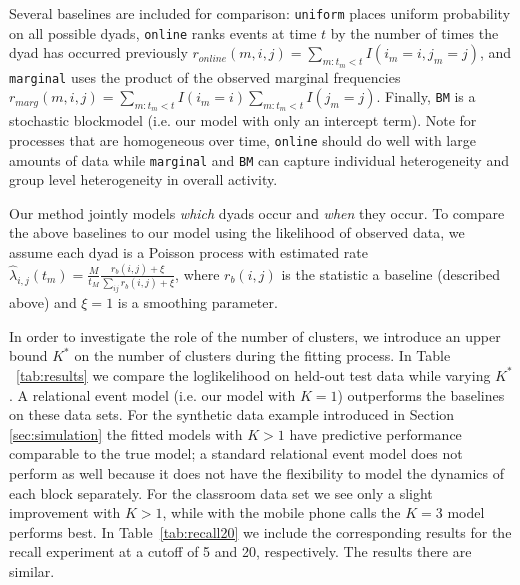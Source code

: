 


Several baselines are included for comparison: \texttt{uniform} places uniform probability on all possible dyads, \texttt{online} ranks events at time $t$ by the number of times the dyad has occurred previously $r_{online}(m,i,j) = \sum_{m:t_m < t} I(i_m=i,j_m=j)$, and \texttt{marginal} uses the product of the observed marginal frequencies $r_{marg}(m,i,j) = \sum_{m:t_m < t} I(i_m=i) \sum_{m:t_m < t} I(j_m=j)$.  
Finally, \texttt{BM} is a stochastic blockmodel (i.e. our model with only an intercept term).
Note for processes that are homogeneous over time, \texttt{online} should do well with large amounts of data while \texttt{marginal} and \texttt{BM} can capture individual heterogeneity and group level heterogeneity in overall activity. 

Our method jointly models \emph{which} dyads occur and \emph{when} they occur.
To compare the above baselines to our model using the likelihood of observed data, we assume each dyad is a Poisson process with estimated  rate $\hat{\lambda}_{i,j}(t_m) = \frac{M}{t_M} \frac{r_{b}(i,j) + \xi}{\sum_{ij} r_{b}(i,j) + \xi}$, where $r_b(i,j)$ is the statistic a baseline (described above) and $\xi=1$ is a smoothing parameter.

In order to investigate the role of the number of clusters, we introduce an upper bound $K^*$ on the number of clusters during the fitting process.  In Table ~\ref{tab:results} we compare the loglikelihood on held-out test data while varying  $K^*$.  A relational event model (i.e. our model with $K=1$) outperforms the baselines on these data sets.  For the synthetic data example introduced in Section \ref{sec:simulation} the fitted models with $K>1$ have predictive performance comparable to the true model; a standard relational event model does not perform as well because it does not have the flexibility to model the dynamics of each block separately.  For the classroom data set we see only a slight improvement with $K>1$, while with the mobile phone calls the $K=3$ model performs best.
In Table~\ref{tab:recall20} we include the corresponding results for the recall experiment at a cutoff of 5 and 20, respectively.  The results there are similar.



